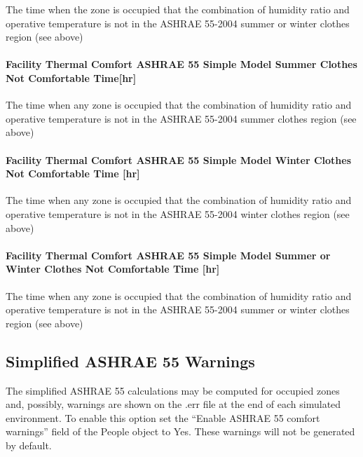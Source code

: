 The time when the zone is occupied that the combination of humidity ratio and operative temperature is not in the ASHRAE 55-2004 summer or winter clothes region (see above)

\paragraph{Facility Thermal Comfort ASHRAE 55 Simple Model Summer Clothes Not Comfortable Time{[}hr{]}}\label{facility-thermal-comfort-ashrae-55-simple-model-summer-clothes-not-comfortable-timehr}

The time when any zone is occupied that the combination of humidity ratio and operative temperature is not in the ASHRAE 55-2004 summer clothes region (see above)

\paragraph{Facility Thermal Comfort ASHRAE 55 Simple Model Winter Clothes Not Comfortable Time {[}hr{]}}\label{facility-thermal-comfort-ashrae-55-simple-model-winter-clothes-not-comfortable-time-hr}

The time when any zone is occupied that the combination of humidity ratio and operative temperature is not in the ASHRAE 55-2004 winter clothes region (see above)

\paragraph{Facility Thermal Comfort ASHRAE 55 Simple Model Summer or Winter Clothes Not Comfortable Time {[}hr{]}}\label{facility-thermal-comfort-ashrae-55-simple-model-summer-or-winter-clothes-not-comfortable-time-hr}

The time when any zone is occupied that the combination of humidity ratio and operative temperature is not in the ASHRAE 55-2004 summer or winter clothes region (see above)

\subsection{Simplified ASHRAE 55 Warnings}\label{simplified-ashrae-55-warnings}

The simplified ASHRAE 55 calculations may be computed for occupied zones and, possibly, warnings are shown on the .err file at the end of each simulated environment. To enable this option set the ``Enable ASHRAE 55 comfort warnings'' field of the People object to Yes. These warnings will not be generated by default.

